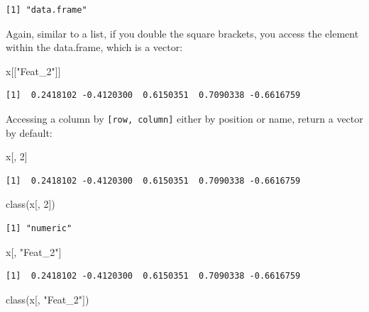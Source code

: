 \documentclass[
]{book}
\newenvironment{Shaded}{\begin{snugshade}}{\end{snugshade}}
\newcommand{\DecValTok}[1]{\textcolor[rgb]{0.00,0.00,0.81}{#1}}
\newcommand{\FunctionTok}[1]{\textcolor[rgb]{0.00,0.00,0.00}{#1}}
\newcommand{\NormalTok}[1]{#1}
\newcommand{\StringTok}[1]{\textcolor[rgb]{0.31,0.60,0.02}{#1}}
\begin{document}
\begin{verbatim}
[1] "data.frame"
\end{verbatim}

Again, similar to a list, if you double the square brackets, you access the element within the data.frame, which is a vector:

\begin{Shaded}
\begin{Highlighting}[]
\NormalTok{x[[}\StringTok{"Feat\_2"}\NormalTok{]]}
\end{Highlighting}
\end{Shaded}

\begin{verbatim}
[1]  0.2418102 -0.4120300  0.6150351  0.7090338 -0.6616759
\end{verbatim}

Accessing a column by \texttt{{[}row,\ column{]}} either by position or name, return a vector by default:

\begin{Shaded}
\begin{Highlighting}[]
\NormalTok{x[, }\DecValTok{2}\NormalTok{]}
\end{Highlighting}
\end{Shaded}

\begin{verbatim}
[1]  0.2418102 -0.4120300  0.6150351  0.7090338 -0.6616759
\end{verbatim}

\begin{Shaded}
\begin{Highlighting}[]
\FunctionTok{class}\NormalTok{(x[, }\DecValTok{2}\NormalTok{])}
\end{Highlighting}
\end{Shaded}

\begin{verbatim}
[1] "numeric"
\end{verbatim}

\begin{Shaded}
\begin{Highlighting}[]
\NormalTok{x[, }\StringTok{"Feat\_2"}\NormalTok{]}
\end{Highlighting}
\end{Shaded}

\begin{verbatim}
[1]  0.2418102 -0.4120300  0.6150351  0.7090338 -0.6616759
\end{verbatim}

\begin{Shaded}
\begin{Highlighting}[]
\FunctionTok{class}\NormalTok{(x[, }\StringTok{"Feat\_2"}\NormalTok{])}
\end{Highlighting}
\end{Shaded}
\end{document}
